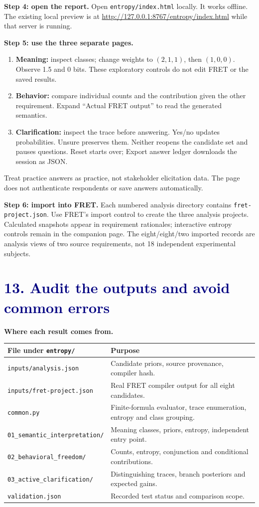 \documentclass[11pt,a4paper]{article}
\newcommand{\lesson}[2]{\section*{\textcolor{navy}{#1. #2}}}
\begin{document}
\textbf{Step 4: open the report.} Open \texttt{entropy/index.html} locally. It works offline. The existing local preview is at \url{http://127.0.0.1:8767/entropy/index.html} while that server is running.

\textbf{Step 5: use the three separate pages.}
\begin{enumerate}
\item \textbf{Meaning:} inspect classes; change weights to \((2,1,1)\), then \((1,0,0)\). Observe 1.5 and 0 bits. These exploratory controls do not edit FRET or the saved results.
\item \textbf{Behavior:} compare individual counts and the contribution given the other requirement. Expand ``Actual FRET output'' to read the generated semantics.
\item \textbf{Clarification:} inspect the trace before answering. Yes/no updates probabilities. Unsure preserves them. Neither reopens the candidate set and pauses questions. Reset starts over; Export answer ledger downloads the session as JSON.
\end{enumerate}
Treat practice answers as practice, not stakeholder elicitation data. The page does not authenticate respondents or save answers automatically.

\textbf{Step 6: import into FRET.} Each numbered analysis directory contains \texttt{fret-project.json}. Use FRET's import control to create the three analysis projects. Calculated snapshots appear in requirement rationales; interactive entropy controls remain in the companion page. The eight/eight/two imported records are analysis views of two source requirements, not 18 independent experimental subjects.
\newpage

\lesson{13}{Audit the outputs and avoid common errors}
\textbf{Where each result comes from.}
\begin{center}
\begin{tabular}{p{55mm}p{85mm}}
\toprule
File under \texttt{entropy/} & Purpose\\\midrule
\texttt{inputs/analysis.json} & Candidate priors, source provenance, compiler hash.\\
\texttt{inputs/fret-project.json} & Real FRET compiler output for all eight candidates.\\
\texttt{common.py} & Finite-formula evaluator, trace enumeration, entropy and class grouping.\\
\texttt{01\_semantic\_interpretation/} & Meaning classes, priors, entropy, independent entry point.\\
\texttt{02\_behavioral\_freedom/} & Counts, entropy, conjunction and conditional contributions.\\
\texttt{03\_active\_clarification/} & Distinguishing traces, branch posteriors and expected gains.\\
\texttt{validation.json} & Recorded test status and comparison scope.\\\bottomrule
\end{tabular}
\end{center}
\end{document}
